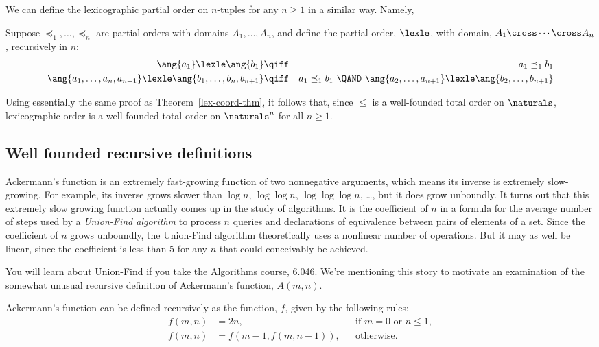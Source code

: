 \iffalse the values of states for the robot in the previous
section were triples not pairs, but\fi We can define the lexicographic
partial order on $n$-tuples for any $n\ge 1$ in a similar way.
Namely,
\begin{definition}\label{lexn}
  Suppose $\preceq_1,\dots, \preceq_n$ are partial orders with domains
  $A_1, \dots, A_n$, and define the partial order, $\lexle$, with domain,
  $A_1 \cross \cdots \cross A_n$, recursively in $n$:
\begin{eqnarray*}
\ang{a_1} \lexle \ang{b_1} &\qiff& a_1 \preceq_1 b_1\\
\ang{a_1,\dots,a_n,a_{n+1}} \lexle \ang{b_1,\dots,b_n,b_{n+1}} &\qiff&
  a_1 \preceq_1 b_1\ \QAND\
    \ang{a_2,\dots,a_{n+1}} \lexle \ang{b_2,\dots,b_{n+1}}
\end{eqnarray*}
\end{definition}
Using essentially the same proof as Theorem~\ref{lex-coord-thm}, it
follows that, since $\le$ is a well-founded total order on
$\naturals$, lexicographic order is a well-founded total order on
$\naturals^n$ for all $n \ge 1$.


\subsection{Well founded recursive definitions}

Ackermann's function is an extremely fast-growing function of two
nonnegative arguments, which means its inverse is extremely slow-growing.
For example, its inverse grows slower than $\log n$, $\log \log n$, $\log
\log \log n$, \dots, but it does grow unboundly.  It turns out that this
extremely slow growing function actually comes up in the study of
algorithms.  It is the coefficient of $n$ in a formula for the average
number of steps used by a \emph{Union-Find algorithm} to process $n$
queries and declarations of equivalence between pairs of elements of a
set.  Since the coefficient of $n$ grows unboundly, the Union-Find
algorithm theoretically uses a nonlinear number of operations.  But it may
as well be linear, since the coefficient is less than 5 for any $n$ that
could conceivably be achieved.

You will learn about Union-Find if you take the Algorithms course, 6.046.
We're mentioning this story to motivate an examination of the somewhat
unusual recursive definition of Ackermann's function, $A(m,n)$.

Ackermann's function can be defined recursively as the function, $f$,
given by the following rules:
\begin{align}
f(m,n) &=  2n, &&\text{if $m=0$ or $n \le 1$},\label{Am0}\\ 
f(m,n) &=  f(m-1,f(m,n-1)), &&\text{otherwise}.\label{AA}
\end{align}


